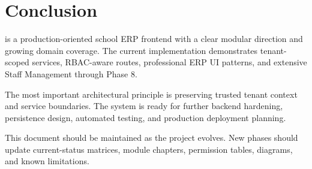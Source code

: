 \chapter{Conclusion}
\ProjectName{} is a production-oriented school ERP frontend with a clear modular direction and growing domain coverage. The current implementation demonstrates tenant-scoped services, RBAC-aware routes, professional ERP UI patterns, and extensive Staff Management through Phase 8.

The most important architectural principle is preserving trusted tenant context and service boundaries. The system is ready for further backend hardening, persistence design, automated testing, and production deployment planning.

\begin{importantbox}
This document should be maintained as the project evolves. New phases should update current-status matrices, module chapters, permission tables, diagrams, and known limitations.
\end{importantbox}
